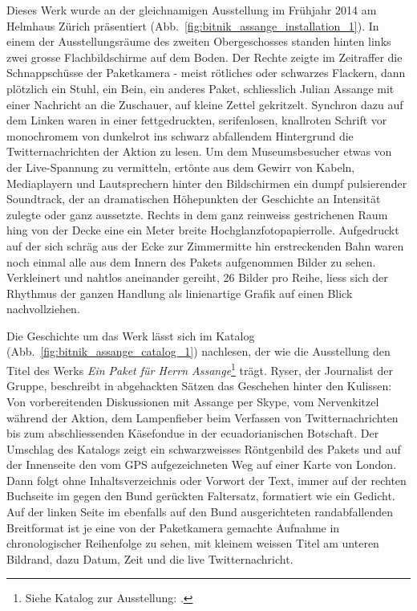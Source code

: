 \documentclass[
paper=164mm:234mm, %
pagesize, %
DIV=calc, %
10pt, %
parskip=half- %
]{scrbook}
\begin{document}
Dieses Werk wurde an der gleichnamigen Ausstellung im Frühjahr 2014 am Helmhaus Zürich präsentiert (Abb.~\ref{fig:bitnik_assange_installation_1}). In einem der Ausstellungsräume des zweiten Obergeschosses standen hinten links zwei grosse Flachbildschirme auf dem Boden. Der Rechte zeigte im Zeitraffer die Schnappschüsse der Paketkamera - meist rötliches oder schwarzes Flackern, dann plötzlich ein Stuhl, ein Bein, ein anderes Paket, schliesslich Julian Assange mit einer Nachricht an die Zuschauer, auf kleine Zettel gekritzelt. Synchron dazu auf dem Linken waren in einer fettgedruckten, serifenlosen, knallroten Schrift vor monochromem von dunkelrot ins schwarz abfallendem Hintergrund die Twitternachrichten der Aktion zu lesen. Um dem Museumsbesucher etwas von der Live-Spannung zu vermitteln, ertönte aus dem Gewirr von Kabeln, Mediaplayern und Lautsprechern hinter den Bildschirmen ein dumpf pulsierender Soundtrack, der an dramatischen Höhepunkten der Geschichte an Intensität zulegte oder ganz aussetzte.
Rechts in dem ganz reinweiss gestrichenen Raum hing von der Decke eine ein Meter breite Hochglanzfotopapierrolle. Aufgedruckt auf der sich schräg aus der Ecke zur Zimmermitte hin erstreckenden Bahn waren noch einmal alle aus dem Innern des Pakets aufgenommen Bilder zu sehen. Verkleinert und nahtlos aneinander gereiht, 26 Bilder pro Reihe, liess sich der Rhythmus der ganzen Handlung als linienartige Grafik auf einen Blick nachvollziehen.

Die Geschichte um das Werk lässt sich im Katalog (Abb.~\ref{fig:bitnik_assange_catalog_1}) nachlesen, der wie die Ausstellung den Titel des Werks \emph{Ein Paket für Herrn Assange}\footnote{Siehe Katalog zur Ausstellung: \cite{Ryser/MediengruppeBitnik:2014}.} trägt. Ryser, der Journalist der Gruppe, beschreibt in abgehackten Sätzen das Geschehen hinter den Kulissen: Von vorbereitenden Diskussionen mit Assange per Skype, vom Nervenkitzel während der Aktion, dem Lampenfieber beim Verfassen von Twitternachrichten bis zum abschliessenden Käsefondue in der ecuadorianischen Botschaft. Der Umschlag des Katalogs zeigt ein schwarzweisses Röntgenbild des Pakets und auf der Innenseite den vom GPS aufgezeichneten Weg auf einer Karte von London. Dann folgt ohne Inhaltsverzeichnis oder Vorwort der Text, immer auf der rechten Buchseite im gegen den Bund gerückten Faltersatz, formatiert wie ein Gedicht. Auf der linken Seite im ebenfalls auf den Bund ausgerichteten randabfallenden Breitformat ist je eine von der Paketkamera gemachte Aufnahme in chronologischer Reihenfolge zu sehen, mit kleinem weissen Titel am unteren Bildrand, dazu Datum, Zeit und die live Twitternachricht.
\end{document}

